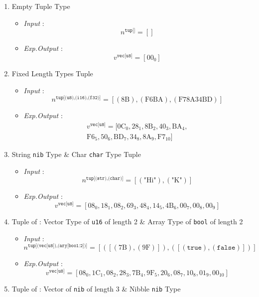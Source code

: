 \documentclass[../alan-handbook.tex]{subfiles}
\begin{document}
\begin{enumerate}
    \item Empty Tuple Type 
        \begin{itemize}
            \item \textit{Input} : $$ n^{\texttt{tup[]}}  = []$$
            \item \textit{Exp.Output} : $$v^{\texttt{vec[u8]}} = [\text{00}_0]$$
        \end{itemize}
    \item Fixed Length Types Tuple
        \begin{itemize}
            \item \textit{Input} : $$ n^{\texttt{tup[(u8),(i16),(f32)]}}  = [(\text{8B}),(\text{F6BA}),(\text{F78A34BD})]$$
            \item \textit{Exp.Output} : $$\begin{matrix}v^{\texttt{vec[u8]}} = [\text{0C}_0,\text{28}_1,\text{8B}_2,\text{40}_3,\text{BA}_4,\\ \text{F6}_5,\text{50}_6,\text{BD}_7,\text{34}_8,\text{8A}_9,\text{F7}_{10}]\end{matrix}$$
        \end{itemize}
    \item String \texttt{nib} Type \& Char \texttt{char} Type Tuple
        \begin{itemize}
            \item \textit{Input} : $$ n^{\texttt{tup[(str),(char)]}}  = [(\text{"Hi"}),(\text{"K"})]$$
            \item \textit{Exp.Output} : $$v^{\texttt{vec[u8]}} = [\text{08}_0,\text{18}_1,\text{08}_2,\text{69}_3,\text{48}_4,\text{14}_5,\text{4B}_6,\text{00}_7,\text{00}_8,\text{00}_9]$$
        \end{itemize}
    \item Tuple of : Vector Type of \texttt{u16} of length 2 \& Array Type of \texttt{bool} of length 2 
        \begin{itemize}
            \item \textit{Input} : $$n^{\texttt{tup[(vec[u8]),(ary[bool:2])]}} = [([(\text{7B}),(\text{9F})]),([(\texttt{true}),(\texttt{false})])]$$
            \item \textit{Exp.Output} : $$v^{\texttt{vec[u8]}} = [\text{08}_0,\text{1C}_1,\text{08}_2,\text{28}_3,\text{7B}_4,\text{9F}_5,\text{20}_6,\text{08}_7,\text{10}_8,\text{01}_9,\text{00}_{10}]$$
        \end{itemize}
    \item Tuple of : Vector of \texttt{nib} of length 3 \& Nibble \texttt{nib} Type 

\end{enumerate}
\end{document}
